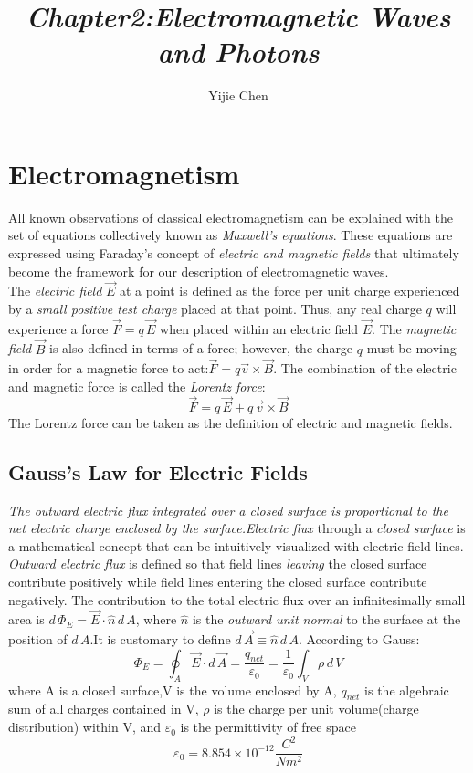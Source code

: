 \documentclass[12pt]{article}
\title{\emph{Chapter2:Electromagnetic Waves and Photons}}
\author{Yijie Chen}
\date{}
\numberwithin{equation}{section}
\begin{document}
\maketitle
\tableofcontents
\newpage
\section{Electromagnetism}
All known observations of classical electromagnetism can be explained with the set of equations collectively known as \emph{Maxwell's equations}.
These equations are expressed using Faraday's concept of \emph{electric and magnetic fields} that ultimately become the framework for our description of electromagnetic waves.\\
\indent The \emph{electric field} $\vec{E}$ at a point is defined as the force per unit charge experienced by a \emph{small positive test charge} placed at that point.
Thus, any real charge $q$ will experience a force $\vec{F}=q\,\vec{E}$ when placed within an electric field $\vec{E}$.
The \emph{magnetic field} $\vec{B}$ is also defined in terms of a force; however, the charge $q$ must be moving in order for a magnetic force to act:$\vec{F}=q\vec{v}\times \vec{B}$.
The combination of the electric and magnetic force is called the \emph{Lorentz force}:
\begin{equation}
    \vec{F}=q\,\vec{E}+q\,\vec{v}\times \vec{B}
\end{equation}
The Lorentz force can be taken as the definition of electric and magnetic fields.
\subsection{Gauss's Law for Electric Fields}
\emph{The outward electric flux integrated over a closed surface is proportional to the net electric charge enclosed by the surface.Electric flux} through a \emph{closed surface} is a mathematical concept that can be intuitively visualized with electric field lines.
\emph{Outward electric flux} is defined so that field lines \emph{leaving} the closed surface contribute positively while field lines entering the closed surface contribute negatively.
The contribution to the total electric flux over an infinitesimally small area is $d\,\Phi_E=\vec{E}\cdot \hat{n}\,d\,A $, where $\hat{n}$ is the \emph{outward unit normal} to the surface at the position of $d\,A$.It is customary to define $d\,\vec{A}\equiv \hat{n}\,d\,A$.
According to Gauss:
\begin{equation}
    \Phi_E=\oint_A \vec{E}\cdot d\,\vec{A}=\frac{q_{net}}{\varepsilon_0}=\frac{1}{\varepsilon_0}\int_V \rho \,d\,V\label{12}
\end{equation}
where A is a closed surface,V is the volume enclosed by A, $q_{net}$ is the algebraic sum of all charges contained in V, $\rho$ is the charge per unit volume(charge distribution) within V, and $\varepsilon_{0}$ is the permittivity of free space 
\begin{equation}
    \varepsilon_{0}=8.854\times 10^{-12}\frac{C^2}{Nm^2}
\end{equation}
\newpage
\end{document}
